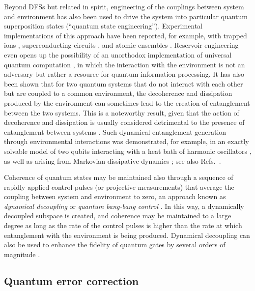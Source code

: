 \documentclass[3p,sort&compress,12pt]{elsarticle}
\begin{document}
Beyond DFSs but related in spirit, engineering of the couplings between system and  environment has also been used to drive the system into particular quantum superposition states (``quantum state engineering''). Experimental implementations of this approach have been reported, for example, with trapped ions \cite{Barreiro:2011:oo,Lin:2013:pp,Kienzler:2015:oo}, superconducting circuits \cite{Shankar:2013:pp}, and atomic ensembles \cite{Krauter:2011:ll}. Reservoir engineering even opens up the possibility of an unorthodox implementation of universal quantum computation \cite{Verstraete:2009:ii}, in which the interaction with the environment is not an adversary but rather a resource for quantum information processing. It has also been shown \cite{Braun:2002:aa, Benatti:2003:aa,Kim:2002:oo,Jakobczyk:2002:oo} that for two quantum systems that do not interact with each other but are coupled to a common environment, the decoherence and dissipation produced by the environment can sometimes lead to the creation of entanglement between the two systems. This is a noteworthy result, given that the action of decoherence and dissipation is usually considered detrimental to the presence of entanglement between systems \cite{Zyczkowski:2001:ii,Lee:2004:uu,Barreiro:2010:aa}. Such dynamical entanglement generation through environmental interactions was demonstrated, for example, in an exactly solvable model of two qubits interacting with a heat bath of harmonic oscillators \cite{Braun:2002:aa}, as well as arising from Markovian dissipative dynamics \cite{Benatti:2003:aa}; see also Refs.~\cite{Kim:2002:oo,Jakobczyk:2002:oo}. 

Coherence of quantum states may be maintained also through a sequence of rapidly applied control pulses (or projective measurements) that average the coupling between system and environment to zero, an approach known as \emph{dynamical decoupling} or \emph{quantum bang-bang control} \cite{Viola:1998:uu,Viola:1999:zp,Zanardi:1999:oo,Viola:2000:pp,Wu:2002:aa,Wu:2002:bb}. In this way, a dynamically decoupled subspace is created, and coherence may be maintained to a large degree as long as the rate of the control pulses is higher than the rate at which entanglement with the environment is being produced. Dynamical decoupling can also be used to enhance the fidelity of quantum gates by several orders of magnitude \cite{Viola:1999:pp,West:2010:oo}.

\subsection{\label{sec:corr-decoh-induc}Quantum error correction}
\end{document}
